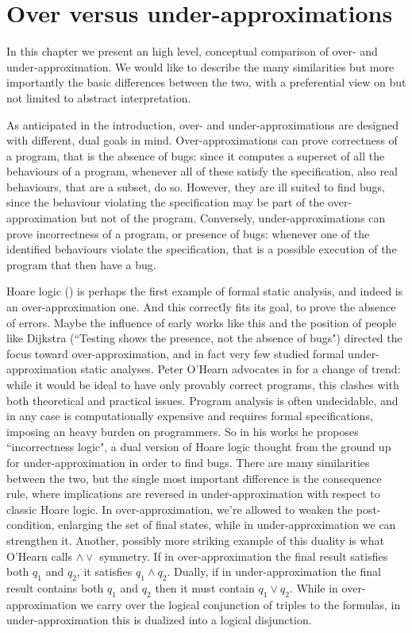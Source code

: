 \chapter{Over versus under-approximations}
In this chapter we present an high level, conceptual comparison of over- and under-approximation. We would like to describe the many similarities but more importantly the basic differences between the two, with a preferential view on but not limited to abstract interpretation.

As anticipated in the introduction, over- and under-approximations are designed with different, dual goals in mind.
Over-approximations can prove correctness of a program, that is the absence of bugs: since it computes a superset of all the behaviours of a program, whenever all of these satisfy the specification, also real behaviours, that are a subset, do so. However, they are ill suited to find bugs, since the behaviour violating the specification may be part of the over-approximation but not of the program.
Conversely, under-approximations can prove incorrectness of a program, or presence of bugs: whenever one of the identified behaviours violate the specification, that is a possible execution of the program that then have a bug.

Hoare logic (\cite{hoare-logic}) is perhaps the first example of formal static analysis, and indeed is an over-approximation one. And this correctly fits its goal, to prove the absence of errors. Maybe the influence of early works like this and the position of people like Dijkstra (``Testing shows the presence, not the absence of bugs") directed the focus toward over-approximation, and in fact very few studied formal under-approximation static analyses.
Peter O'Hearn advocates in \cite{ohearn-incorrectness-logic} for a change of trend: while it would be ideal to have only provably correct programs, this clashes with both theoretical and practical issues. Program analysis is often undecidable, and in any case is computationally expensive and requires formal specifications, imposing an heavy burden on programmers.
So in his works he proposes ``incorrectness logic", a dual version of Hoare logic thought from the ground up for under-approximation in order to find bugs. There are many similarities between the two, but the single most important difference is the consequence rule, where implications are reversed in under-approximation with respect to classic Hoare logic. In over-approximation, we're allowed to weaken the post-condition, enlarging the set of final states, while in under-approximation we can strengthen it.
Another, possibly more striking example of this duality is what O'Hearn calls $\land \lor$ symmetry. If in over-approximation the final result satisfies both $q_1$ and $q_2$, it satisfies $q_1 \land q_2$. Dually, if in under-approximation the final result contains both $q_1$ and $q_2$ then it must contain $q_1 \lor q_2$. While in over-approximation we carry over the logical conjunction of triples to the formulas, in under-approximation this is dualized into a logical disjunction.

